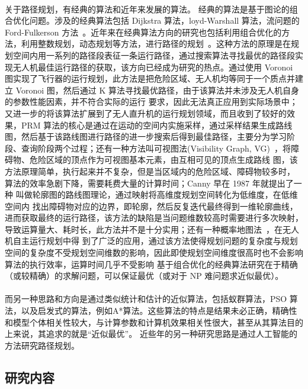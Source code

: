 \documentclass[UTF8,a4paper]{ctexart}
\begin{document}
\paragraph{}关于路径规划，有经典的算法和近年来发展的算法。 经典的算法是基于图论的组合优化问题。涉及的经典算法包括 Dijkstra 算法，loyd-Warshall 算法，流问题的 Ford-Fulkerson 方法~\cite{introtoalgo}。近年来在经典算法方向的研究也包括利用组合优化的方法，利用整数规划，动态规划等方法，进行路径的规划~\cite{introtoor}。这种方法的原理是在规划空间内用一系列的路径段表征一条运行路径，通过搜索算法寻找最优的路径段实现无人机最佳运行路径的获取，该方向已经成为研究的热点。通过使用 Voronoi 图实现了飞行器的运行规划，此方法是把危险区域、无人机均等同于一个质点并建立 Voronoi 图，然后通过 K 算法寻找最优路径，由于该算法并未涉及无人机自身的参数性能因素，并不符合实际的运行 要求，因此无法真正应用到实际场景中；又进一步的将该算法扩展到了无人直升机的运行规划领域，而且收到了较好的效果，PRM 算法的核心是通过在运动的空间内实施采样，通过采样结果生成路线图，然后基于该路线图进行路径的进一步搜索后得到最佳路径，主要分为学习阶段、查询阶段两个过程；还有一种方法叫可视图法(Visibility Graph, VG)~\cite{2005coordination}，将障碍物、危险区域的顶点作为可视图基本元素，由互相可见的顶点生成路线 图，该方法原理简单，执行起来并不复杂，但是当区域内的危险区域、障碍物较多时， 算法的效率急剧下降，需要耗费大量的计算时间；Canny 早在 1987 年就提出了一种 叫做轮廓图的路线图理论，通过映射将高维度规划空间转化为低维度，在低维空间内 找出障碍物对应的边界，即轮廓，然后反复迭代最终得到一维轮廓曲线，进而获取最终的运行路径，该方法的缺陷是当问题维数较高时需要进行多次映射，导致运算量大、耗时长，此方法并不是十分实用；还有一种概率地图法~\cite{zhangyi2007j}，在无人机自主运行规划中得 到了广泛的应用，通过该方法使得规划问题的复杂度与规划空间的复杂度不受规划空间维数的影响，因此即使规划空间维度很高时也不会影响算法的执行效率，运算时间几乎不受影响 基于组合优化的经典算法研究在于精确（或较精确）的求解问题，可以保证最优（或对于 NP 难问题求近似最优）。~\cite{chenyan2009}
\paragraph{}而另一种思路和方向是通过类似统计和估计的近似算法，包括蚁群算法，PSO 算法，以及启发式的算法，例如A*算法。这些算法的特点是结果未必正确，精确性和模型个体相关性较大，与计算参数和计算机效果相关性很大，甚至从其算法目的上来说，其追求的就是“近似最优”。 近些年的另一种研究思路是通过人工智能的方法研究路径规划。

\subsection{研究内容}
\end{document}
